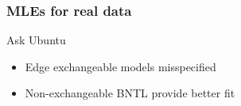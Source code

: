 \documentclass[final,hyperref={pdfpagelabels=false},noamsthm]{beamer}
\def\Geom{\text{Geom}}
\newcommand{\PYP}{\mathcal{PYP}}
\newcommand{\geom}{\beta}
\begin{document}
\begin{frame}
	\frametitle{MLEs for real data}
	Ask Ubuntu
	\begin{itemize}
		\item Edge exchangeable models misspecified
		\item Non-exchangeable BNTL provide better fit
	\end{itemize}
\end{frame}
	
\end{document}
